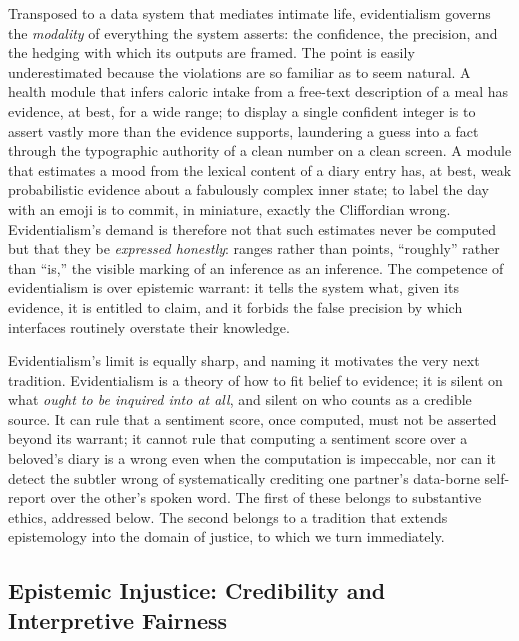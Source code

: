 \documentclass[11pt,a4paper]{article}
\begin{document}
Transposed to a data system that mediates intimate life, evidentialism governs the \emph{modality} of everything the system asserts: the confidence, the precision, and the hedging with which its outputs are framed. The point is easily underestimated because the violations are so familiar as to seem natural. A health module that infers caloric intake from a free-text description of a meal has evidence, at best, for a wide range; to display a single confident integer is to assert vastly more than the evidence supports, laundering a guess into a fact through the typographic authority of a clean number on a clean screen. A module that estimates a mood from the lexical content of a diary entry has, at best, weak probabilistic evidence about a fabulously complex inner state; to label the day with an emoji is to commit, in miniature, exactly the Cliffordian wrong. Evidentialism's demand is therefore not that such estimates never be computed but that they be \emph{expressed honestly}: ranges rather than points, ``roughly'' rather than ``is,'' the visible marking of an inference as an inference. The competence of evidentialism is over epistemic warrant: it tells the system what, given its evidence, it is entitled to claim, and it forbids the false precision by which interfaces routinely overstate their knowledge.

Evidentialism's limit is equally sharp, and naming it motivates the very next tradition. Evidentialism is a theory of how to fit belief to evidence; it is silent on what \emph{ought to be inquired into at all}, and silent on who counts as a credible source. It can rule that a sentiment score, once computed, must not be asserted beyond its warrant; it cannot rule that computing a sentiment score over a beloved's diary is a wrong even when the computation is impeccable, nor can it detect the subtler wrong of systematically crediting one partner's data-borne self-report over the other's spoken word. The first of these belongs to substantive ethics, addressed below. The second belongs to a tradition that extends epistemology into the domain of justice, to which we turn immediately.

\subsection{Epistemic Injustice: Credibility and Interpretive Fairness}\label{p01:sec:epistemic-injustice}
\end{document}
